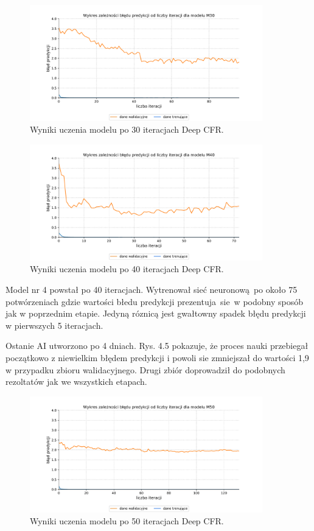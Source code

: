 \documentclass[12pt,oneside,a4paper]{report}
\begin{document}
\vspace{0.5cm}

\begin{figure}[!ht]
  \centering
  \includegraphics[width=0.9\textwidth]{./img/model3.pdf}
\caption{Wyniki uczenia modelu po 30 iteracjach Deep CFR.}
\end{figure}


\begin{figure}[!ht]
  \centering
  \includegraphics[width=0.9\textwidth]{./img/model4.pdf}
\caption{Wyniki uczenia modelu po 40 iteracjach Deep CFR.}
\end{figure}

Model nr 4 powstał po 40 iteracjach. Wytrenował sieć neuronową po około 75 potwórzeniach gdzie 
wartości błedu predykcji prezentuja sie w podobny sposób jak w poprzednim etapie. Jedyną róznicą
jest gwałtowny spadek błędu predykcji w pierwszych 5 iteracjach.

Ostanie AI utworzono po 4 dniach. Rys. 4.5 pokazuje, że proces nauki przebiegał początkowo z 
niewielkim błędem predykcji i powoli sie zmniejszał do wartości 1,9 w przypadku zbioru walidacyjnego.
Drugi zbiór doprowadził do podobnych rezoltatów jak we wszystkich etapach.

\begin{figure}[!ht]
  \centering
  \includegraphics[width=0.9\textwidth]{./img/model5.pdf}
\caption{Wyniki uczenia modelu po 50 iteracjach Deep CFR.}
\end{figure}
\end{document}
